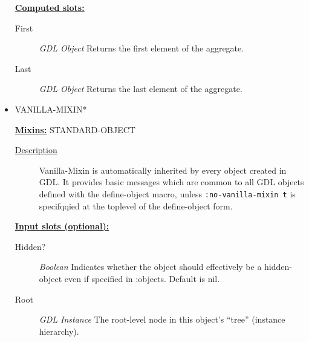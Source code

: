 \documentclass [11pt]{book}
\begin{document}
\begin{itemize}
\begin{description}
\end{description}








\textbf{
\underline{Computed slots:}}

\begin{description}

\item [First]
\emph{GDL Object} Returns the first element of the aggregate.


\item [Last]
\emph{GDL Object} Returns the last element of the aggregate.


\end{description}







\item {}VANILLA-MIXIN*


\textbf{
\underline{Mixins:}} STANDARD-OBJECT





\begin{description}

\item [
\underline{Description}]


Vanilla-Mixin is automatically inherited by every object
created in GDL. It provides basic messages which are common to all GDL objects defined
with the define-object macro, unless \texttt{:no-vanilla-mixin t} is specifqqied at the toplevel
of the define-object form.



\end{description}








\textbf{
\underline{Input slots (optional):}}

\begin{description}

\item [Hidden?]
\emph{Boolean} Indicates whether the object should effectively be a hidden-object even if specified in :objects. Default is nil.


\item [Root]
\emph{GDL Instance} The root-level node in this object's ``tree'' (instance hierarchy).



\end{description}
\end{itemize}
\end{document}
